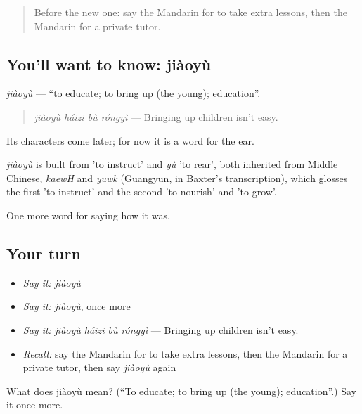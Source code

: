\label{lesson:ZH-C493-jiaoyu}



\begin{quote}
Before the new one: say the Mandarin for to take extra lessons, then the Mandarin for a private tutor.
\end{quote}

\subsection*{You'll want to know: jiàoyù}
\emph{jiàoyù} — \textquotedblleft{}to educate; to bring up (the young); education\textquotedblright{}.

\begin{quote}
\emph{jiàoyù háizi bù róngyì} — Bringing up children isn't easy.
\end{quote}

Its characters come later; for now it is a word for the ear.

\begin{cousinweb}
\emph{jiàoyù} is built from  'to instruct' and \emph{yù} 'to rear', both inherited from Middle Chinese, \emph{kaewH} and \emph{yuwk} (Guangyun, in Baxter's transcription), which glosses the first 'to instruct' and the second 'to nourish' and 'to grow'.
\end{cousinweb}

\begin{grammarlens}[title={What you've built}]
One more word for saying how it was.
\end{grammarlens}

\subsection*{Your turn}
\begin{itemize}
\raggedright
  \item \emph{Say it:} \emph{jiàoyù}
  \item \emph{Say it:} \emph{jiàoyù}, once more
  \item \emph{Say it:} \emph{jiàoyù háizi bù róngyì} — Bringing up children isn't easy.
  \item \emph{Recall:} say the Mandarin for to take extra lessons, then the Mandarin for a private tutor, then say \emph{jiàoyù} again
\end{itemize}

\begin{tcolorbox}[breakable,colback=teal!4,colframe=teal!35!black,title={Before you move on}]
What does jiàoyù mean? (\textquotedblleft{}To educate; to bring up (the young); education\textquotedblright{}.) Say it once more.
\end{tcolorbox}
